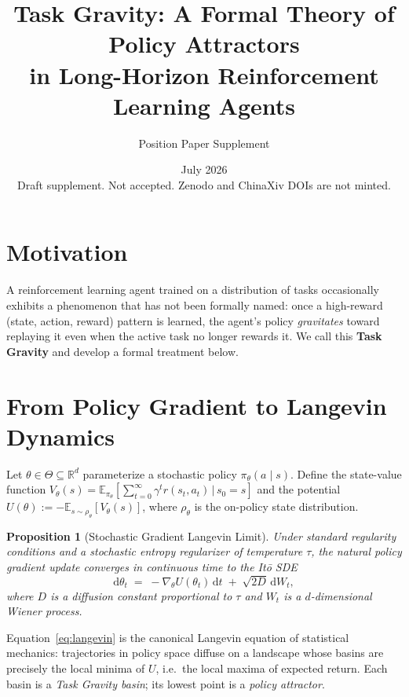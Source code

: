 \documentclass[10pt]{article}
\title{\textbf{Task Gravity: A Formal Theory of Policy Attractors\\
in Long-Horizon Reinforcement Learning Agents}}
\author{Position Paper Supplement}
\date{July 2026 \\
\small Draft supplement. Not accepted. Zenodo and ChinaXiv DOIs are not minted.}
\newtheorem{proposition}{Proposition}
\begin{document}
\maketitle

\section{Motivation}

A reinforcement learning agent trained on a distribution of tasks
occasionally exhibits a phenomenon that has not been formally named:
once a high-reward (state, action, reward) pattern is learned, the
agent's policy \emph{gravitates} toward replaying it even when the
active task no longer rewards it. We call this \textbf{Task Gravity}
and develop a formal treatment below.

\section{From Policy Gradient to Langevin Dynamics}

Let $\theta \in \Theta \subseteq \mathbb{R}^d$ parameterize a stochastic
policy $\pi_\theta(a \mid s)$. Define the state-value function
$V_\theta(s) = \mathbb{E}_{\pi_\theta}\!\left[\sum_{t=0}^{\infty}
\gamma^t r(s_t, a_t)\,\big|\, s_0 = s\right]$ and the potential
$U(\theta) := -\mathbb{E}_{s \sim \rho_\theta}\!\left[V_\theta(s)\right]$,
where $\rho_\theta$ is the on-policy state distribution.

\begin{proposition}[Stochastic Gradient Langevin Limit]
Under standard regularity conditions and a stochastic entropy
regularizer of temperature $\tau$, the natural policy gradient update
converges in continuous time to the It\=o SDE
\begin{equation}\label{eq:langevin}
  \mathrm{d}\theta_t \;=\; -\nabla_\theta U(\theta_t)\,\mathrm{d}t
  \;+\; \sqrt{2D}\,\mathrm{d}W_t,
\end{equation}
where $D$ is a diffusion constant proportional to $\tau$ and
$W_t$ is a $d$-dimensional Wiener process.
\end{proposition}

\noindent
Equation~\eqref{eq:langevin} is the canonical Langevin equation of
statistical mechanics: trajectories in policy space diffuse on a
landscape whose basins are precisely the local minima of $U$, i.e.\
the local maxima of expected return. Each basin is a
\emph{Task Gravity basin}; its lowest point is a \emph{policy attractor}.
\end{document}
